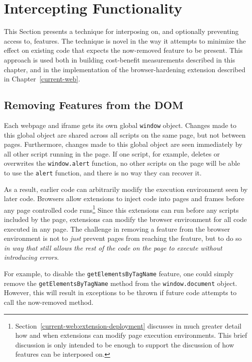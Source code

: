 \section{Intercepting \JS Functionality}
\label{cost-benefit:intercepting-js}

This Section presents a technique for interposing on, and optionally preventing
access to, \WAPI features.  The technique is novel in the way it attempts to
minimize the effect on existing code that expects the now-removed feature to be
present.  This approach is used both in building cost-benefit measurements
described in this chapter, and in the implementation of the browser-hardening
extension described in Chapter~\ref{current-web}.


\subsection{Removing Features from the DOM}
\label{cost-benefit:intercepting-js:featremove}
Each webpage and iframe gets its own global \texttt{window} object.  Changes
made to this global object are shared across all scripts on the same page, but
not between pages.  Furthermore, changes made to this global object are seen
immediately by all other script running in the page.  If one script, for
example, deletes or overwrites the \texttt{window.alert} function, no other
scripts on the page will be able to use the \texttt{alert} function, and there
is no way they can recover it.

As a result, earlier code can arbitrarily modify the execution environment seen
by later code.  Browsers allow extensions to inject \JS code into pages and
frames before any page controlled code
runs\footnote{Section~\ref{current-web:extension-deployment} discusses in much
greater detail how and when extensions can modify page execution environments.
This brief discussion is only intended to be enough to support the discussion
of how \WAPI features can be interposed on.} Since this extensions can run
before any scripts included by the page, extensions can modify the browser
environment for all code executed in any page.  The challenge in removing a
feature from the browser environment is not to \emph{just} prevent pages from
reaching the feature, but to do so \emph{in way that still allows the rest of
the code on the page to execute without introducing errors}.

For example, to disable the \texttt{getElementsByTagName} feature, one could
simply remove the \texttt{getElementsByTagName} method from the
\texttt{window.document} object. However, this will result in exceptions to
be thrown if future code attempts to call the now-removed method.

